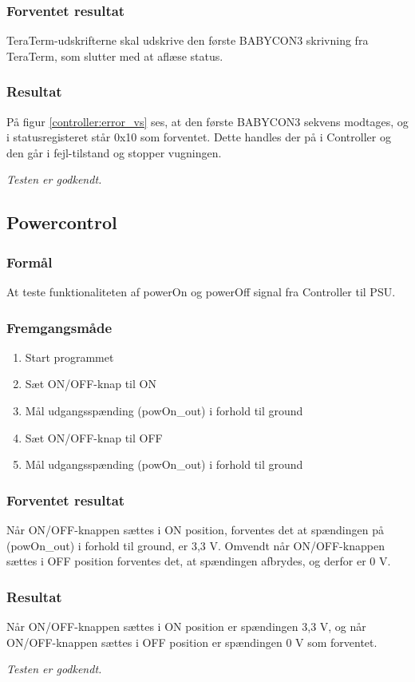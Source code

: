 \subsubsection*{Forventet resultat} 
TeraTerm-udskrifterne skal udskrive den første BABYCON3 skrivning fra TeraTerm, som slutter med at aflæse status. 

\subsubsection*{Resultat} 
På figur \ref{controller:error_vs} ses, at den første BABYCON3 sekvens modtages, og i statusregisteret står 0x10 som forventet. Dette handles der på i Controller og den går i fejl-tilstand og stopper vugningen.  


\textit{Testen er godkendt.}

\subsection*{Powercontrol}

\subsubsection*{Formål}
At teste funktionaliteten af powerOn og powerOff signal fra Controller til PSU.

\subsubsection*{Fremgangsmåde}
\begin{enumerate}
\item Start programmet
\item Sæt ON/OFF-knap til ON
\item Mål udgangsspænding (powOn\_out) i forhold til ground
\item Sæt ON/OFF-knap til OFF
\item Mål udgangsspænding (powOn\_out) i forhold til ground

\end{enumerate}

\subsubsection*{Forventet resultat}
Når ON/OFF-knappen sættes i ON position, forventes det at spændingen på (powOn\_out) i forhold til ground, er 3,3 V. Omvendt når ON/OFF-knappen sættes i OFF position forventes det, at spændingen afbrydes, og derfor er 0 V.

\subsubsection*{Resultat} 
Når ON/OFF-knappen sættes i ON position er spændingen 3,3 V, og når ON/OFF-knappen sættes i OFF position er spændingen 0 V som forventet.

\textit{Testen er godkendt.}